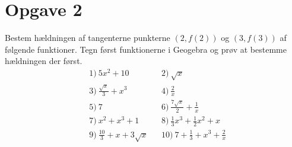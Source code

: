 \section*{Opgave 2}
Bestem hældningen af tangenterne punkterne $(2,f(2))$ og $ (3,f(3))$ af følgende funktioner. Tegn først funktionerne i Geogebra og prøv at bestemme hældningen der først. 
\begin{align*}
&1) \ 5x^2+10   &&2) \ \sqrt{x}    \\
&3) \ \frac{\sqrt{x}}{3} + x^3  &&4) \ \frac{2}{x}   \\
&5) \ 7   &&6) \ \frac{7\sqrt{x}}{2} + \frac{1}{x}   \\
&7) \ x^2+x^3+1  &&8) \ \frac{1}{3}x^3+\frac{1}{2}x^2 + x    \\
&9) \ \frac{10}{3} + x+3\sqrt{x}   &&10) \ 7+\frac{1}{3} + x^3 + \frac{2}{x}    \\
\end{align*} 
